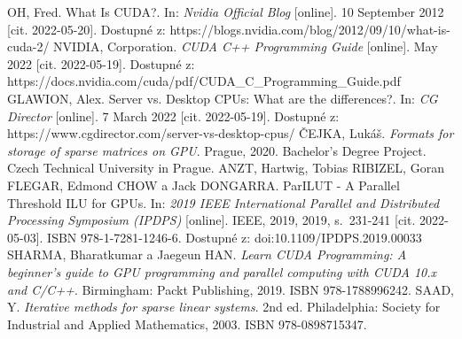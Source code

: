 \begin{thebibliography}{38}
	OH, Fred. What Is CUDA?. In: \textit{Nvidia Official Blog} [online]. 10 September 2012 [cit. 2022-05-20]. Dostupné z: https://blogs.nvidia.com/blog/2012/09/10/what-is-cuda-2/
	NVIDIA, Corporation. \textit{CUDA C++ Programming Guide} [online]. May 2022 [cit. 2022-05-19]. Dostupné z: https://docs.nvidia.com/cuda/pdf/CUDA\_C\_Programming\_Guide.pdf
	GLAWION, Alex. Server vs. Desktop CPUs: What are the differences?. In: \textit{CG Director} [online]. 7 March 2022 [cit. 2022-05-19]. Dostupné z: https://www.cgdirector.com/server-vs-desktop-cpus/
	ČEJKA, Lukáš. \textit{Formats for storage of sparse matrices on GPU}. Prague, 2020. Bachelor's Degree Project. Czech Technical University in Prague.
	ANZT, Hartwig, Tobias RIBIZEL, Goran FLEGAR, Edmond CHOW a Jack DONGARRA. ParILUT - A Parallel Threshold ILU for GPUs. In: \textit{2019 IEEE International Parallel and Distributed Processing Symposium (IPDPS)} [online]. IEEE, 2019, 2019, s.~231-241 [cit. 2022-05-03]. ISBN 978-1-7281-1246-6. Dostupné z: doi:10.1109/IPDPS.2019.00033
	SHARMA, Bharatkumar a Jaegeun HAN. \textit{Learn CUDA Programming: A beginner's guide to GPU programming and parallel computing with CUDA 10.x and C/C++}. Birmingham: Packt Publishing, 2019. ISBN 978-1788996242.
	SAAD, Y. \textit{Iterative methods for sparse linear systems}. 2nd ed. Philadelphia: Society for Industrial and Applied Mathematics, 2003. ISBN 978-0898715347.
	
\end{thebibliography}